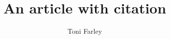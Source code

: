 \documentclass{article}
\title{An article with citation}
\author{Toni Farley}
\date{}
\begin{document}



\nocite{Yousef2017,David2010,Abrar2016,Creighton2018}


  
\end{document}
